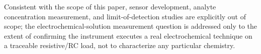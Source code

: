 Consistent with the scope of this paper, sensor development, analyte
concentration measurement, and limit-of-detection studies are explicitly
out of scope; the electrochemical-solution measurement question is
addressed only to the extent of confirming the instrument executes a real
electrochemical technique on a traceable resistive/RC load, not to
characterize any particular chemistry.
